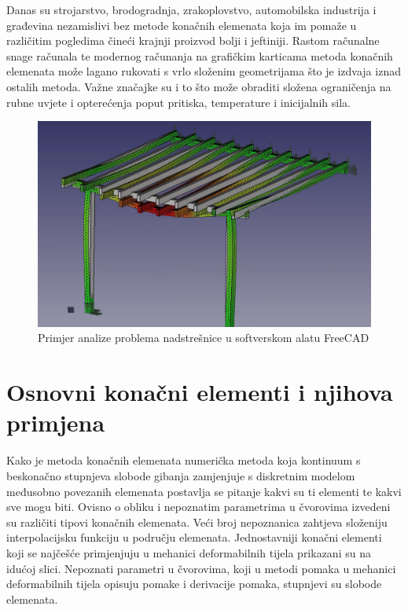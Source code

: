 \documentclass[a4paper,twoside,12pt]{memoir} %
\begin{document}
Danas su strojarstvo, brodogradnja, zrakoplovstvo, automobilska industrija i građevina nezamislivi bez metode konačnih elemenata koja im pomaže u različitim pogledima čineći krajnji proizvod bolji i jeftiniji. Rastom računalne snage računala te modernog računanja na grafičkim karticama metoda konačnih elemenata može lagano rukovati s vrlo složenim geometrijama što je izdvaja iznad ostalih metoda. Važne značajke su i to što može obraditi složena ograničenja na rubne uvjete i opterećenja poput pritiska, temperature i inicijalnih sila.
\begin{figure}[h!t]
\begin{center}
\includegraphics[scale=0.3]{pictures/chapter_fem/FEM_primjer.png}
\caption{Primjer analize problema nadstrešnice u softverskom alatu FreeCAD \cite{youtube_freecad}}
\end{center}
\end{figure}


\section{Osnovni konačni elementi i njihova primjena}
Kako je metoda konačnih elemenata numerička metoda koja kontinuum s beskonačno stupnjeva slobode gibanja zamjenjuje s diskretnim modelom međusobno povezanih elemenata postavlja se pitanje kakvi su ti elementi te kakvi sve mogu biti. Ovisno o obliku i nepoznatim parametrima u čvorovima izvedeni su različiti tipovi konačnih elemenata. Veći broj nepoznanica zahtjeva složeniju interpolacijsku funkciju u području elemenata. Jednostavniji konačni elementi koji se najčešće primjenjuju u mehanici deformabilnih tijela prikazani su na idućoj slici. Nepoznati parametri u čvorovima, koji u metodi pomaka u mehanici deformabilnih tijela opisuju pomake i derivacije pomaka, stupnjevi su slobode elemenata. \par
\end{document}
